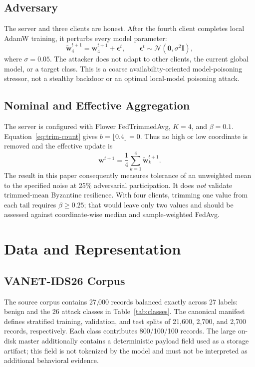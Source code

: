 \documentclass[journal]{IEEEtran}
\begin{document}
\subsection{Adversary}
The server and three clients are honest. After the fourth client completes local AdamW training, it perturbs every model parameter:
\begin{equation}
    \widetilde{\mathbf{w}}_4^{t+1}
      = \mathbf{w}_4^{t+1} + \boldsymbol{\epsilon}^{t},
    \qquad
    \boldsymbol{\epsilon}^{t}\sim\mathcal{N}(\mathbf{0},\sigma^2\mathbf{I}),
    \label{eq:noise}
\end{equation}
where $\sigma=0.05$. The attacker does not adapt to other clients, the current global model, or a target class. This is a coarse availability-oriented model-poisoning stressor, not a stealthy backdoor or an optimal local-model poisoning attack.

\subsection{Nominal and Effective Aggregation}
The server is configured with Flower FedTrimmedAvg, $K=4$, and $\beta=0.1$. Equation~\eqref{eq:trim-count} gives $b=\lfloor0.4\rfloor=0$. Thus no high or low coordinate is removed and the effective update is
\begin{equation}
    \mathbf{w}^{t+1}=\frac{1}{4}\sum_{k=1}^{4}\widetilde{\mathbf{w}}_k^{t+1}.
    \label{eq:effective-mean}
\end{equation}
The result in this paper consequently measures tolerance of an unweighted mean to the specified noise at 25\% adversarial participation. It does \emph{not} validate trimmed-mean Byzantine resilience. With four clients, trimming one value from each tail requires $\beta\geq0.25$; that would leave only two values and should be assessed against coordinate-wise median and sample-weighted FedAvg.

\section{Data and Representation}

\subsection{VANET-IDS26 Corpus}
The source corpus \cite{vanetids26dataset} contains 27,000 records balanced exactly across 27 labels: benign and the 26 attack classes in Table~\ref{tab:classes}. The canonical manifest defines stratified training, validation, and test splits of 21,600, 2,700, and 2,700 records, respectively. Each class contributes 800/100/100 records. The large on-disk master additionally contains a deterministic payload field used as a storage artifact; this field is not tokenized by the model and must not be interpreted as additional behavioral evidence.
\end{document}
